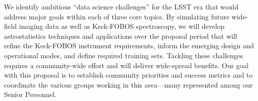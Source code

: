 \documentclass[oneside,11pt]{amsart}
\begin{document}
We identify ambitious ``data science challenges'' for the LSST era that would address major goals within each of three
core topics.  By simulating future wide-field imaging data as well as Keck-FOBOS spectroscopy, we will develop
astrostatistics techniques and applications over the proposal period that will refine the Keck-FOBOS instrument
requirements, inform the emerging design and operational modes, and define required training sets.  Tackling these
challenges requires a community-wide effort and will deliver wide-spread benefits.  Our goal with this
proposal is to establish community priorities and success metrics and to coordinate the various groups working in this
area---many represented among our Senior Personnel.


\end{document}
